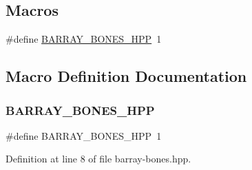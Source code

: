 \subsection*{Macros}
\begin{DoxyCompactItemize}
\item 
\#define \hyperlink{barray-bones_8hpp_a130b55fea4c46b3fc84dc76b641f5f0d}{B\+A\+R\+R\+A\+Y\+\_\+\+B\+O\+N\+E\+S\+\_\+\+H\+PP}~1
\end{DoxyCompactItemize}


\subsection{Macro Definition Documentation}
\mbox{\label{barray-bones_8hpp_a130b55fea4c46b3fc84dc76b641f5f0d}} 
\subsubsection{\texorpdfstring{B\+A\+R\+R\+A\+Y\+\_\+\+B\+O\+N\+E\+S\+\_\+\+H\+PP}{BARRAY\_BONES\_HPP}}
{\footnotesize\ttfamily \#define B\+A\+R\+R\+A\+Y\+\_\+\+B\+O\+N\+E\+S\+\_\+\+H\+PP~1}



Definition at line 8 of file barray-\/bones.\+hpp.

